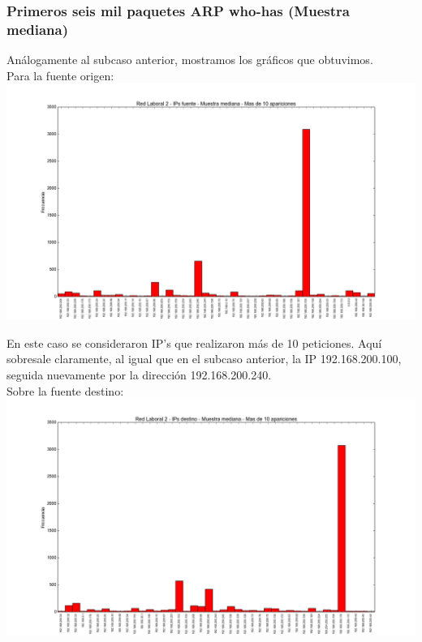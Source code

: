 \subsubsection{Primeros seis mil paquetes ARP who-has (Muestra mediana)}

\indent \indent Análogamente al subcaso anterior, mostramos los gráficos que obtuvimos.\\
\indent Para la fuente origen:\\

\includegraphics[scale=0.5,clip=true,trim=140 0 0 0]{graphics/laburomediano_src.png}

\indent En este caso se consideraron IP's que realizaron más de 10 peticiones. Aquí sobresale claramente, al igual que en el subcaso anterior, la IP 192.168.200.100, seguida nuevamente por la dirección 192.168.200.240.\\

\indent Sobre la fuente destino:\\

\includegraphics[scale=0.5,clip=true,trim=140 0 0 0]{graphics/laburomediano_dst.png}

